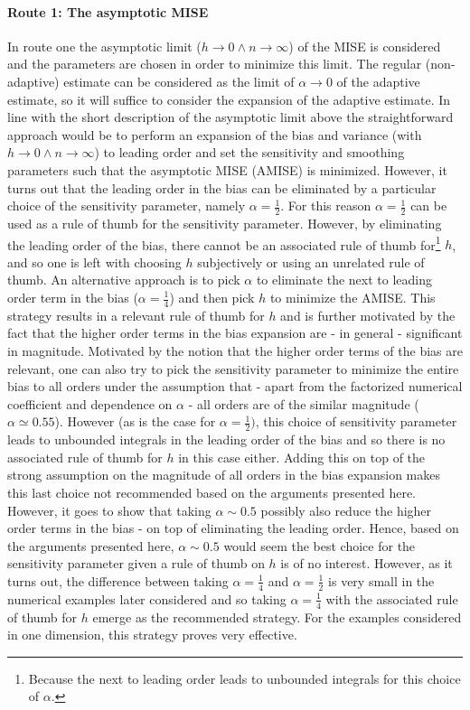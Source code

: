 \paragraph{Route 1: The asymptotic MISE}
In route one the asymptotic limit ($h\rightarrow 0\wedge  n\rightarrow \infty$) of the MISE is considered and the parameters are chosen in order to minimize this limit. The regular (non-adaptive) estimate can be considered as the limit of $\alpha\rightarrow 0$ of the adaptive estimate, so it will suffice to consider the expansion of the adaptive estimate.\newline
In line with the short description of the asymptotic limit above the straightforward approach would be to perform an expansion of the bias and variance (with $h\rightarrow 0\wedge  n\rightarrow \infty$) to leading order and set the sensitivity and smoothing parameters such that the asymptotic MISE (AMISE) is minimized. However, it turns out that the leading order in the bias can be eliminated by a particular choice of the sensitivity parameter, namely $\alpha=\frac{1}{2}$. For this reason $\alpha=\frac{1}{2}$ can be used as a rule of thumb for the sensitivity parameter\citep{silverman}. However, by eliminating the leading order of the bias, there cannot be an associated rule of thumb for\footnote{Because the next to leading order leads to unbounded integrals for this choice of $\alpha$.} $h$, and so one is left with choosing $h$ subjectively or using an unrelated rule of thumb. An alternative approach is to pick $\alpha$ to eliminate the next to leading order term in the bias ($\alpha=\frac{1}{4}$) and then pick $h$ to minimize the AMISE. This strategy results in a relevant rule of thumb for $h$ and is further motivated by the fact that the higher order terms in the bias expansion are - in general - significant in magnitude. Motivated by the notion that the higher order terms of the bias are relevant, one can also try to pick the sensitivity parameter to minimize the entire bias to all orders under the assumption that - apart from the factorized numerical coefficient and dependence on $\alpha$ - all orders are of the similar magnitude ($\alpha \simeq 0.55$). However (as is the case for $\alpha=\frac{1}{2})$, this choice of sensitivity parameter leads to unbounded integrals in the leading order of the bias and so there is no associated rule of thumb for $h$ in this case either. Adding this on top of the strong assumption on the magnitude of all orders in the bias expansion makes this last choice not recommended based on the arguments presented here. However, it goes to show that taking $\alpha\sim 0.5$ possibly also reduce the higher order terms in the bias - on top of eliminating the leading order. Hence, based on the arguments presented here, $\alpha\sim 0.5$ would seem the best choice for the sensitivity parameter given a rule of thumb on $h$ is of no interest. However, as it turns out, the difference between taking $\alpha=\frac{1}{4}$ and $\alpha=\frac{1}{2}$ is very small in the numerical examples later considered and so taking $\alpha=\frac{1}{4}$ with the associated rule of thumb for $h$ emerge as the recommended strategy. For the examples considered in one dimension, this strategy proves very effective.\newline\newline
